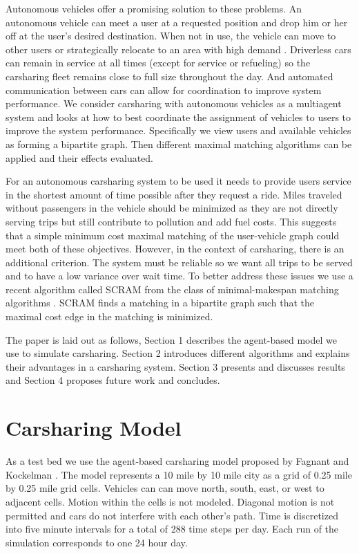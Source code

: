 \documentclass[letterpaper]{article}
\begin{document}
Autonomous vehicles offer a promising solution to these problems. An autonomous vehicle can meet a user at a requested position and drop him or her off at the user's desired destination. When not in use, the vehicle can move to other users or strategically relocate to an area with high demand \cite{fagnant2014travel}. Driverless cars can remain in service at all times (except for service or refueling) so the carsharing fleet remains close to full size throughout the day. And automated communication between cars can allow for coordination to improve system performance. We consider carsharing with autonomous vehicles as a multiagent system and looks at how to best coordinate the assignment of vehicles to users to improve the system performance. Specifically we view users and available vehicles as forming a bipartite graph. Then different maximal matching algorithms can be applied and their effects evaluated.

For an autonomous carsharing system to be used it needs to provide users service in the shortest amount of time possible after they request a ride. Miles traveled without passengers in the vehicle should be minimized as they are not directly serving trips but still contribute to pollution and add fuel costs. This suggests that a simple minimum cost maximal matching of the user-vehicle graph could meet both of these objectives. However, in the context of carsharing, there is an additional criterion. The system must be reliable so we want all trips to be served and to have a low variance over wait time. To better address these issues we use a recent algorithm called SCRAM from the class of minimal-makespan matching algorithms \cite{macalpine2015scram}. SCRAM finds a matching in a bipartite graph such that the maximal cost edge in the matching is minimized. 

The paper is laid out as follows, Section 1 describes the agent-based model we use to simulate carsharing. Section 2 introduces different algorithms and explains their advantages in a carsharing system. Section 3 presents and discusses results and Section 4 proposes future work and concludes.


\section{Carsharing Model}

As a test bed we use the agent-based carsharing model proposed by Fagnant and Kockelman \cite{fagnant2014travel}. The model represents a 10 mile by 10 mile city as a grid of 0.25 mile by 0.25 mile grid cells. Vehicles can can move north, south, east, or west to adjacent cells. Motion within the cells is not modeled. Diagonal motion is not permitted and cars do not interfere with each other's path. Time is discretized into five minute intervals for a total of 288 time steps per day. Each run of the simulation corresponds to one 24 hour day.
\end{document}
